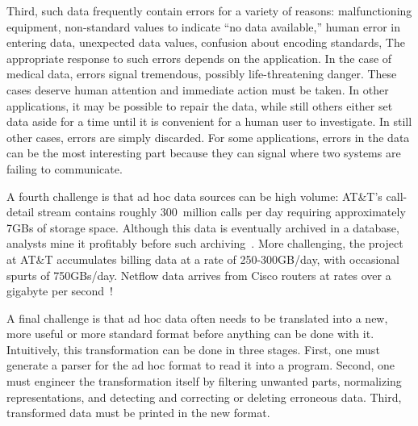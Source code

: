 \documentclass[11pt]{article}
\begin{document}
Third, such data frequently contain errors for a variety of reasons:
malfunctioning equipment, non-standard values to 
indicate ``no data available,'' human error in
entering data, unexpected data values, confusion about
encoding standards, \etc{} The appropriate response
to such errors depends on the application.    
In the case of medical data, errors signal tremendous,
possibly life-threatening danger.  These cases deserve
human attention and immediate action must be taken.
In other applications, it may be possible to
repair the data, while still others either set data aside for a time
until it is convenient for 
a human user to investigate.  In still other cases,
errors are simply discarded.  For some applications, errors in the data can
be the most interesting part because they can signal where two systems
are failing to communicate.  

A fourth challenge is that ad hoc data sources can be high volume:
AT\&T's call-detail stream contains roughly 300~million calls per day
requiring approximately 7GBs of storage space. Although this data is
eventually archived in a database, analysts mine it profitably before
such archiving~\cite{kdd98,kdd99}. More challenging, the \ningaui{}
project at AT\&T accumulates billing data at a rate of 250-300GB/day,
with occasional spurts of 750GBs/day. Netflow data arrives from Cisco
routers at rates over a gigabyte per second~\cite{gigascope}! 

A final challenge is that ad hoc data often needs to be translated
into a new, more useful or more standard format before anything
can be done with it.  Intuitively, this transformation
can be done in three stages.  First, one must generate a parser for
the ad hoc format to read it into a program.  Second,
one must engineer the transformation itself by
filtering unwanted parts, normalizing representations, and
detecting and correcting or deleting erroneous data.  Third,
transformed data must be printed in the new format.

\end{document}
